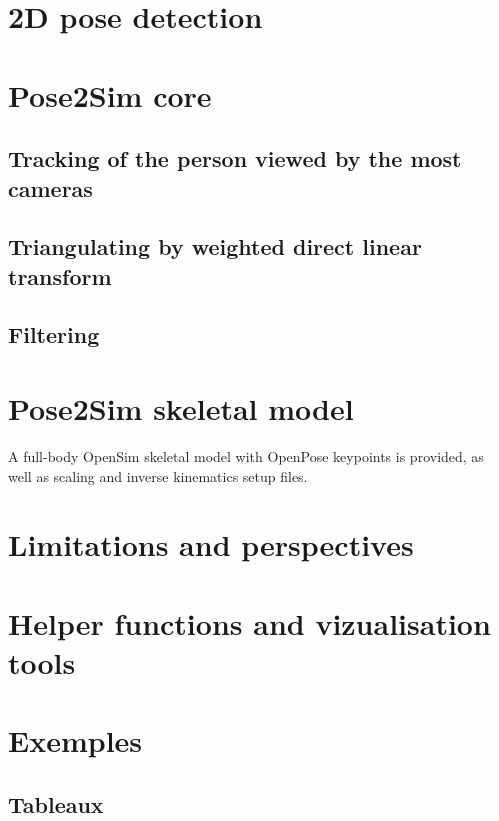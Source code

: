 \section{2D pose detection}
\blindtext


\section{Pose2Sim core}
\subsection{Tracking of the person viewed by the most cameras}
\blindtext

\subsection{Triangulating by weighted direct linear transform}
\blindtext

\subsection{Filtering}
\blindtext


\section{Pose2Sim skeletal model}

A full-body OpenSim \cite{Delp2007,Seth2018} skeletal model with OpenPose keypoints is provided, as well as scaling and inverse kinematics setup files.


\section{Limitations and perspectives}
\blindtext


\section{Helper functions and vizualisation tools}
\blindtext



\section{Exemples}

\FloatBarrier
\subsection{Tableaux}

